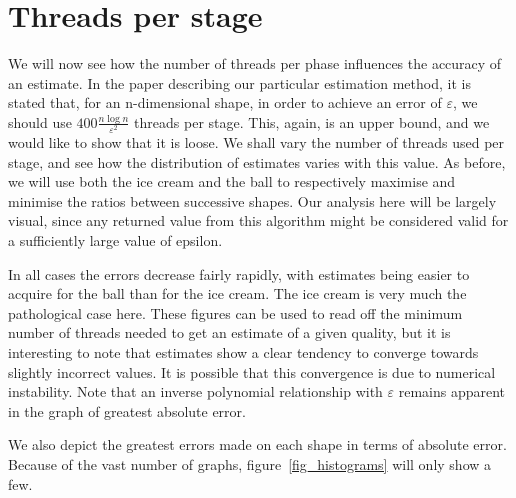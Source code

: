 \section{Threads per stage}\label{sec_error}

We will now see how the number of threads per phase influences the accuracy of an estimate. In the paper describing our particular estimation method, it is stated that, for an n-dimensional shape, in order to achieve an error of $\varepsilon$, we should use $400\frac{n\log n}{\varepsilon^2}$ threads per stage. This, again, is an upper bound, and we would like to show that it is loose. We shall vary the number of threads used per stage, and see how the distribution of estimates varies with this value. As before, we will use both the ice cream and the ball to respectively maximise and minimise the ratios between successive shapes. Our analysis here will be largely visual, since any returned value from this algorithm might be considered valid for a sufficiently large value of epsilon.

In all cases the errors decrease fairly rapidly, with estimates being easier to acquire for the ball than for the ice cream. The ice cream is very much the pathological case here. These figures can be used to read off the minimum number of threads needed to get an estimate of a given quality, but it is interesting to note that estimates show a clear tendency to converge towards slightly incorrect values. It is possible that this convergence is due to numerical instability. Note that an inverse polynomial relationship with $\varepsilon$ remains apparent in the graph of greatest absolute error.

We also depict the greatest errors made on each shape in terms of absolute error. Because of the vast number of graphs, figure~\ref{fig_histograms} will only show a few.

